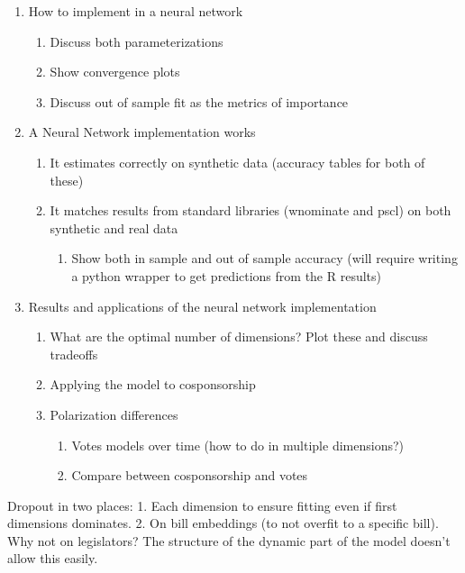 \documentclass[11pt,]{article}
\providecommand{\tightlist}{%
\setlength{\itemsep}{0pt}\setlength{\parskip}{0pt}}
\begin{document}
\begin{enumerate}
\def\labelenumi{\arabic{enumi}.}
\tightlist
\item
  How to implement in a neural network

  \begin{enumerate}
  \def\labelenumii{\alph{enumii}.}
  \tightlist
  \item
    Discuss both parameterizations
  \item
    Show convergence plots
  \item
    Discuss out of sample fit as the metrics of importance
  \end{enumerate}
\item
  A Neural Network implementation works

  \begin{enumerate}
  \def\labelenumii{\alph{enumii}.}
  \tightlist
  \item
    It estimates correctly on synthetic data (accuracy tables for both
    of these)
  \item
    It matches results from standard libraries (wnominate and pscl) on
    both synthetic and real data

    \begin{enumerate}
    \def\labelenumiii{\roman{enumiii}.}
    \tightlist
    \item
      Show both in sample and out of sample accuracy (will require
      writing a python wrapper to get predictions from the R results)
    \end{enumerate}
  \end{enumerate}
\item
  Results and applications of the neural network implementation

  \begin{enumerate}
  \def\labelenumii{\alph{enumii}.}
  \tightlist
  \item
    What are the optimal number of dimensions? Plot these and discuss
    tradeoffs
  \item
    Applying the model to cosponsorship
  \item
    Polarization differences

    \begin{enumerate}
    \def\labelenumiii{\roman{enumiii}.}
    \tightlist
    \item
      Votes models over time (how to do in multiple dimensions?)
    \item
      Compare between cosponsorship and votes
    \end{enumerate}
  \end{enumerate}
\end{enumerate}

Dropout in two places: 1. Each dimension to ensure fitting even if first
dimensions dominates. 2. On bill embeddings (to not overfit to a
specific bill). Why not on legislators? The structure of the dynamic
part of the model doesn't allow this easily.




\newpage
\singlespacing 

\end{document}
